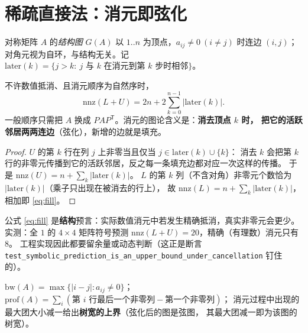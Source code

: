 \section{稀疏直接法：消元即弦化}
\label{sec:sparse}

\begin{definition}[图与消元]
对称矩阵 $A$ 的\emph{结构图} $G(A)$ 以 $1..n$ 为顶点，$a_{ij}\ne0\ (i\ne j)$ 时连边 $(i,j)$；
对角元视为自环，与结构无关。记 $\mathrm{later}(k)=\{j>k:\ j\text{ 与 }k\text{ 在消元到第 }k\text{ 步时相邻}\}$。
\end{definition}

\begin{theorem}[填充公式]
\label{thm:fill}
不许数值抵消、且消元顺序为自然序时，
\begin{equation}
  \mathrm{nnz}(L+U)=2n+2\sum_{k=0}^{n-1}|\mathrm{later}(k)| .
  \label{eq:fill}
\end{equation}
一般顺序只需把 $A$ 换成 $PAP^{\mathsf T}$。消元的图论含义是：\textbf{消去顶点 $k$ 时，
把它的活跃邻居两两连边}（弦化），新增的边就是填充。
\end{theorem}

\begin{proof}
$U$ 的第 $k$ 行在列 $j$ 上非零当且仅当 $j\in\mathrm{later}(k)\cup\{k\}$：
消去 $k$ 会把第 $k$ 行的非零元传播到它的活跃邻居，反之每一条填充边都对应一次这样的传播。
于是 $\mathrm{nnz}(U)=n+\sum_k|\mathrm{later}(k)|$。
$L$ 的第 $k$ 列（不含对角）非零元个数恰为 $|\mathrm{later}(k)|$（乘子只出现在被消去的行上），
故 $\mathrm{nnz}(L)=n+\sum_k|\mathrm{later}(k)|$，相加即 \eqref{eq:fill}。
\end{proof}

\begin{remark}[符号预测是上界]
公式 \eqref{eq:fill} 是\textbf{结构}预言：实际数值消元中若发生精确抵消，真实非零元会更少。
实测：全 $1$ 的 $4\times4$ 矩阵符号预测 $\mathrm{nnz}(L+U)=20$，精确（有理数）消元只有 $8$。
工程实现因此都要留余量或动态判断（这正是断言
\texttt{test\_\allowbreak{}symbolic\_\allowbreak{}prediction\_\allowbreak{}is\_\allowbreak{}an\_\allowbreak{}upper\_\allowbreak{}bound\_\allowbreak{}under\_\allowbreak{}cancellation} 钉住的）。
\end{remark}

\begin{definition}[带宽、剖面、树宽上界]
$\mathrm{bw}(A)=\max\{|i-j|:a_{ij}\ne0\}$；
$\mathrm{prof}(A)=\sum_i(\text{第 }i\text{ 行最后一个非零列}-\text{第一个非零列})$；
消元过程中出现的最大团大小减一给出\textbf{树宽的上界}（弦化后的图是弦图，
其最大团减一即为该图的树宽）。
\end{definition}

